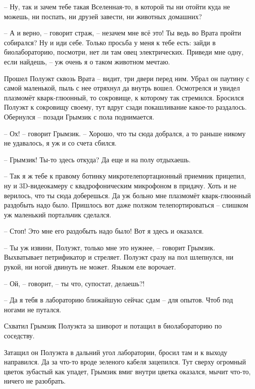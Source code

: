 \documentclass[ebook,oneside,final,openright]{memoir}
\begin{document}
– Ну, так и зачем тебе такая Вселенная-то, в которой ты ни отойти куда не можешь, ни поспать, ни друзей завести, ни животных домашних? \par
– А и верно, – говорит страж, – незачем мне всё это! Ты ведь во Врата пройти собирался? Ну и иди себе. Только просьба у меня к тебе есть: зайди в биолабораторию, посмотри, нет ли там овец электрических. Приведи мне одну, если найдешь, – уж очень я о таком животном мечтаю.\par
\par
\par
Прошел Полуэкт сквозь Врата – видит, три двери перед ним. Убрал он паутину с самой маленькой, пыль с нее отряхнул да внутрь вошел. Осмотрелся и увидел плазмомёт кварк-глюонный, то сокровище, к которому так стремился. Бросился Полуэкт к сокровищу своему, тут вдруг сзади покашливание какое-то раздалось. Обернулся – позади Грымзик с пола поднимается.\par
– Ох! – говорит Грымзик. – Хорошо, что ты сюда добрался, а то раньше никому не удавалось, я уж и со счета сбился.\par
– Грымзик! Ты-то здесь откуда? Да еще и на полу отдыхаешь.\par
– Так я ж тебе к правому ботинку микротелепортационный приемник прицепил, ну и 3D-видеокамеру с квадрофоническим микрофоном в придачу. Хоть и не верилось, что ты сюда доберешься. Да уж больно мне плазмомёт кварк-глюонный раздобыть надо было. Пришлось вот даже ползком телепортироваться – слишком уж маленький портальчик сделался.\par
– Стоп! Это мне его раздобыть надо было! Вот я здесь и оказался.\par
– Ты уж извини, Полуэкт, только мне это нужнее, – говорит Грымзик. Выхватывает петрификатор и стреляет. Полуэкт сразу на пол шлепнулся, ни рукой, ни ногой двинуть не может. Языком еле ворочает.\par
– Ой, – говорит, – ты что, супостат, делаешь?!\par
– Да я тебя в лабораторию ближайшую сейчас сдам – для опытов. Чтоб под ногами не путался.\par
Схватил Грымзик Полуэкта за шиворот и потащил в биолабораторию по соседству.\par
\par
Затащил он Полуэкта в дальний угол лаборатории, бросил там и к выходу направился. Да за что-то вроде зеленого кабеля зацепился. Тут сверху огромный цветок зубастый как упадет, Грымзик вмиг внутри цветка оказался, мычит что-то, ничего не разобрать.\par
\end{document}
